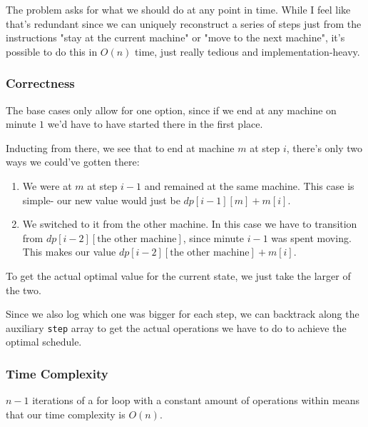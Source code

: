 \documentclass[12pt]{article}
\begin{document}
The problem asks for what we should do at any point in time.
While I feel like that's redundant since we can uniquely reconstruct
a series of steps just from the instructions "stay at the current machine"
or "move to the next machine", it's possible to do this in $O(n)$ time,
just really tedious and implementation-heavy.

\pagebreak

\subsubsection{Correctness}

The base cases only allow for one option,
since if we end at any machine on minute $1$ we'd have to
have started there in the first place.

Inducting from there, we see that to end at machine $m$ at step $i$,
there's only two ways we could've gotten there:
\begin{enumerate}[nosep]
    \item We were at $m$ at step $i-1$ and remained at the same machine.
          This case is simple- our new value would just be $dp[i-1][m]+m[i]$.
    \item We switched to it from the other machine.
          In this case we have to transition from $dp[i-2][\text{the other machine}]$,
          since minute $i-1$ was spent moving.
          This makes our value $dp[i-2][\text{the other machine}]+m[i]$.
\end{enumerate}
To get the actual optimal value for the current state, we just take the larger of the two.

Since we also log which one was bigger for each step,
we can backtrack along the auxiliary \texttt{step} array to get
the actual operations we have to do to achieve the optimal schedule.

\subsubsection{Time Complexity}

$n-1$ iterations of a for loop with a constant amount of operations
within means that our time complexity is $\boxed{O(n)}$.
\end{document}
